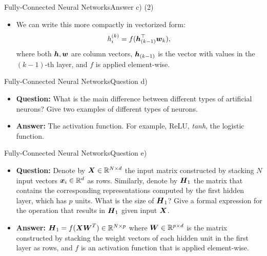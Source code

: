 \documentclass[t]{beamer}
\begin{document}
\begin{frame}{Fully-Connected Neural Networks}{Answer c) (2)}
    \begin{itemize}
        \item We can write this more compactly in vectorized form:
              \begin{equation*}
                  h^{(k)}_i = f({\boldsymbol{h}}_{(k-1)}^\top{\boldsymbol{w}}_k),
              \end{equation*}
              where both ${\boldsymbol{h}},{\boldsymbol{w}}$ are column vectors, ${\boldsymbol{h}}_{(k-1)}$ is the
              vector with values in the $(k-1)$-th layer, and $f$ is applied
              element-wise.
    \end{itemize}
\end{frame}

\begin{frame}{Fully-Connected Neural Networks}{Question d)}
    \begin{itemize}
        \item \textbf{Question:} What is the main difference between different
              types of artificial neurons? Give two examples of different types
              of neurons.
              \pause
        \item \textbf{Answer:} The activation function. For example, ReLU,
              \emph{tanh}, the logistic function.
    \end{itemize}
\end{frame}

\begin{frame}{Fully-Connected Neural Networks}{Question e)}
    \begin{itemize}
        \item \textbf{Question:} Denote by ${\boldsymbol{X}}\in\mathbb{R}^{N\times d}$ the input
              matrix constructed by stacking $N$ input vectors
              ${\boldsymbol{x}}_i\in\mathbb{R}^d$ as rows. Similarly, denote by ${\boldsymbol{H}}_1$ the
              matrix that contains the corresponding representations computed by
              the first hidden layer, which has $p$ units. What is the size of
              ${\boldsymbol{H}}_1$? Give a formal expression for the operation that results
              in ${\boldsymbol{H}}_1$ given input ${\boldsymbol{X}}$.
              \pause
        \item \textbf{Answer:} ${\boldsymbol{H}}_1=f({\boldsymbol{X}}{\boldsymbol{W}}^T)\in\mathbb{R}^{N\times p}$ where
              ${\boldsymbol{W}}\in\mathbb{R}^{p\times d}$ is the matrix constructed by stacking
              the weight vectors of each hidden unit in the first layer as rows,
              and $f$ is an activation function that is applied element-wise.
    \end{itemize}
\end{frame}
\end{document}
